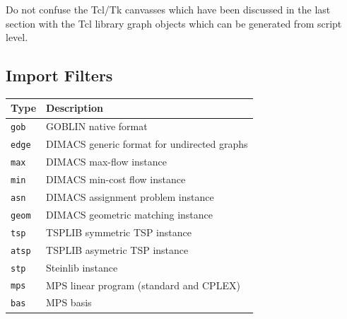 \documentclass[a4paper,11pt,twoside]{book}
\begin{document}
\begin{multicols}{2}
Do not confuse the Tcl/Tk canvasses which have been discussed in the last
section with the Tcl library graph objects which can be generated from script
level.

\subsection{Import Filters}
\bigskip
\begin{center}
\begin{tabular}{|p{2.1cm}|p{10.1cm}|}
\hline
{\bf Type}       & {\bf Description} \\
\hline
\hline
\verb/gob/   & GOBLIN native format\\
\verb/edge/  & DIMACS generic format for undirected graphs \\
\verb/max/   & DIMACS max-flow instance \\
\verb/min/   & DIMACS min-cost flow instance \\
\verb/asn/   & DIMACS assignment problem instance \\
\verb/geom/  & DIMACS geometric matching instance \\
\verb/tsp/   & TSPLIB symmetric TSP instance \\
\verb/atsp/  & TSPLIB asymetric TSP instance \\
\verb/stp/   & Steinlib instance \\
\verb/mps/   & MPS linear program (standard and CPLEX) \\
\verb/bas/   & MPS basis \\
\hline
\end{tabular}
\end{center}



\end{multicols}
\end{document}
